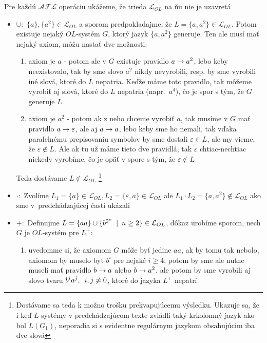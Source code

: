 \begin{dokaz}
Pre každú $\mathcal{AFL}$ operáciu ukážeme, že trieda
$\mathcal{L}_{OL}$ na ňu nie je uzavretá

\begin{itemize}
\item $\cup :$ $\{a\},\{a^{2}\}\in\mathcal{L}_{OL}$ a sporom
predpokladajme, že $L=\{a,a^{2}\}\in\mathcal{L}_{OL}$. Potom
existuje nejaký $OL$-systém $G$, ktorý jazyk $\{a,a^{2}\}$
generuje. Ten ale musí mať nejaký axiom, môžu nastať dve možnosti:

\begin{enumerate}
\item axiom je $a$ - potom ale v $G$ existuje pravidlo $a\rightarrow
a^{2}$, lebo keby neexistovalo, tak by sme slovo $a^{2}$ nikdy
nevyrobili, resp. by sme vyrobili iné slová, ktoré do $L$
nepatria. Keďže máme toto pravidlo, tak môžeme vyrobiť aj slová,
ktoré do $L$ nepatria \mbox{(napr. $a^{4}$)}, čo je spor s tým, že
$G$ generuje $L$

\item axiom je $a^{2}$ - potom ak z neho chceme vyrobiť $a$, tak
musíme v $G$ mať pravidlo $a\rightarrow\varepsilon$, ale aj $a\rightarrow a$, lebo
keby sme ho nemali, tak vďaka paralelnému prepisovaniu symbolov by
sme dostali $\varepsilon\in L$, ale my vieme, že
$\varepsilon\not\in L$. Ale ak tu už máme tieto dve pravidlá, tak
$\varepsilon$ chtiac-nechtiac niekedy vyrobíme, čo je opäť v spore
s tým, že $\varepsilon\not\in L$
\end{enumerate}

Teda dostávame $L\not\in\mathcal{L}_{OL}$ \footnote{Dostávame sa
teda k možno trošku prekvapujúcemu výsledku. Ukazuje sa, že i keď
$L$-systémy v predchádzajúcom texte zvládli taký krkolomný jazyk
ako bol $L(G_{1})$, neporadia si s evidentne regulárnym jazykom
obsahujúcim iba dve slová}

\item $\cdot :$ Zvolíme $L_{1}=\{a\}\in\mathcal{L}_{OL},
L_{2}=\{\varepsilon,a\}\in\mathcal{L}_{OL}$ ale $L_{1}\cdot
L_{2}=\{a,a^{2}\}\not\in\mathcal{L}_{OL}$ ako sme \mbox{v
predchádzajúcej} časti ukázali

\item $+ :$ Definujme $L=\{aa\}\cup\{b^{2^{n}}\enspace |\enspace
n\geq2\}\in\mathcal{L}_{OL}$, dôkaz urobíme sporom, nech $G$ je
$OL$-systém pre $L^{+}$:

\begin{enumerate}
\item uvedomme si, že axiomom $G$ môže byť jedine $aa$, ak by tomu
tak nebolo, axiomom by muselo byť $b^{i}$ pre nejaké $i\geq4$,
potom by sme ale nutne museli mať pravidlo $b\rightarrow a$ alebo $b\rightarrow
a^{2}$, ale potom by sme vyrobili aj slovo tvaru $b^{i}a^{j},\enspace
i,j\neq0$, ktoré do jazyka $L^{+}$ nepatrí


\end{enumerate}
\end{itemize}
\end{dokaz}

